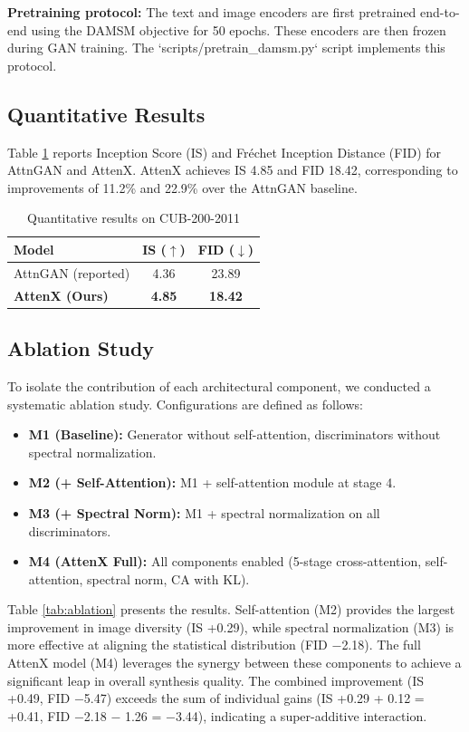 \documentclass[conference]{IEEEtran}
\begin{document}
\textbf{Pretraining protocol:} The text and image encoders are first pretrained end-to-end using the DAMSM objective for 50 epochs. These encoders are then frozen during GAN training. The `scripts/pretrain\_damsm.py` script implements this protocol.

\subsection{Quantitative Results}
Table \ref{tab:results} reports Inception Score (IS) and Fr\'{e}chet Inception Distance (FID) for AttnGAN and AttenX. AttenX achieves IS 4.85 and FID 18.42, corresponding to improvements of 11.2\% and 22.9\% over the AttnGAN baseline.

\begin{table}[htbp]
\caption{Quantitative results on CUB-200-2011}
\centering
\begin{tabular}{@{}lcc@{}}
\toprule
\textbf{Model} & \textbf{IS} ($\uparrow$) & \textbf{FID} ($\downarrow$) \\
\midrule
AttnGAN (reported) & 4.36 & 23.89 \\
\textbf{AttenX (Ours)} & \textbf{4.85} & \textbf{18.42} \\
\bottomrule
\end{tabular}
\label{tab:results}
\end{table}

\subsection{Ablation Study}
To isolate the contribution of each architectural component, we conducted a systematic ablation study. Configurations are defined as follows:

\begin{itemize}
    \item \textbf{M1 (Baseline):} Generator without self-attention, discriminators without spectral normalization.
    \item \textbf{M2 (+ Self-Attention):} M1 + self-attention module at stage 4.
    \item \textbf{M3 (+ Spectral Norm):} M1 + spectral normalization on all discriminators.
    \item \textbf{M4 (AttenX Full):} All components enabled (5-stage cross-attention, self-attention, spectral norm, CA with KL).
\end{itemize}

Table \ref{tab:ablation} presents the results. Self-attention (M2) provides the largest improvement in image diversity (IS +0.29), while spectral normalization (M3) is more effective at aligning the statistical distribution (FID $-$2.18). The full AttenX model (M4) leverages the synergy between these components to achieve a significant leap in overall synthesis quality. The combined improvement (IS +0.49, FID $-$5.47) exceeds the sum of individual gains (IS +0.29 + 0.12 = +0.41, FID $-$2.18 $-$ 1.26 = $-$3.44), indicating a super-additive interaction.
\end{document}
